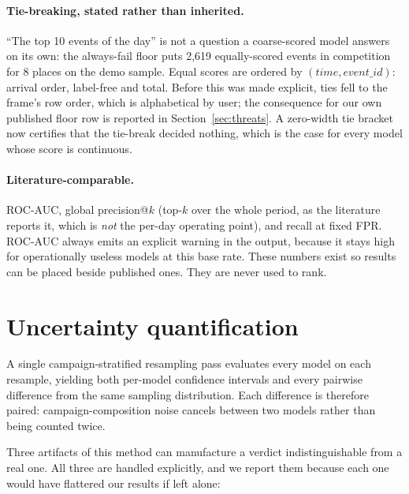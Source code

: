 \documentclass[11pt,a4paper]{article}
\begin{document}
\paragraph{Tie-breaking, stated rather than inherited.} ``The top 10 events of
the day'' is not a question a coarse-scored model answers on its own: the
always-fail floor puts 2{,}619 equally-scored events in competition for 8 places
on the demo sample. Equal scores are ordered by $(\textit{time},
\textit{event\_id})$: arrival order, label-free and total. Before this was made
explicit, ties fell to the frame's row order, which is alphabetical by user; the
consequence for our own published floor row is reported in
Section~\ref{sec:threats}. A zero-width tie bracket now certifies that the
tie-break decided nothing, which is the case for every model whose score is
continuous.

\paragraph{Literature-comparable.} ROC-AUC, global precision@$k$ (top-$k$ over
the whole period, as the literature reports it, which is \emph{not} the per-day
operating point), and recall at fixed FPR. ROC-AUC always emits an explicit
warning in the output, because it stays high for operationally useless models at
this base rate. These numbers exist so results can be placed beside published
ones. They are never used to rank.

\section{Uncertainty quantification}
\label{sec:uncertainty}

A single campaign-stratified resampling pass evaluates every model on each
resample, yielding both per-model confidence intervals and every pairwise
difference from the same sampling distribution. Each difference is therefore
paired: campaign-composition noise cancels between two models rather than being
counted twice.

Three artifacts of this method can manufacture a verdict indistinguishable from a
real one. All three are handled explicitly, and we report them because each one
would have flattered our results if left alone:
\end{document}
